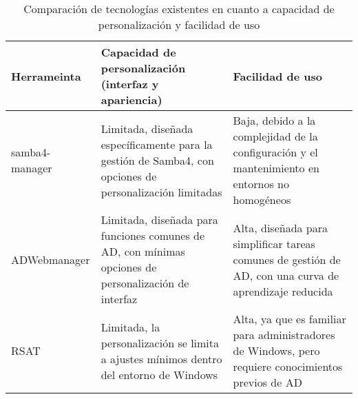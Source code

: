 \begin{longtable}{|l|p{5cm}|p{5cm}|}
    \caption{Comparación de tecnologías existentes en cuanto a capacidad de personalización y facilidad de uso}
    \label{table:ad-tech-comparison}                                                                                                                                                                                                                                                                       \\
    \hline
    \textbf{Herrameinta} & \textbf{Capacidad de personalización (interfaz y apariencia)}                                                                                   & \textbf{Facilidad de uso}                                                                                                     \\
    \hline
    \endfirsthead
    \hline
    samba4-manager       & Limitada, diseñada específicamente para la gestión de Samba4, con opciones de personalización limitadas                                         & Baja, debido a la complejidad de la configuración y el mantenimiento en entornos no homogéneos                                \\
    \hline
    ADWebmanager         & Limitada, diseñada para funciones comunes de AD, con mínimas opciones de personalización de interfaz                                            & Alta, diseñada para simplificar tareas comunes de gestión de AD, con una curva de aprendizaje reducida                        \\
    \hline
    RSAT                 & Limitada, la personalización se limita a ajustes mínimos dentro del entorno de Windows                                                          & Alta, ya que es familiar para administradores de Windows, pero requiere conocimientos previos de AD                           \\
    \hline
\end{longtable}
